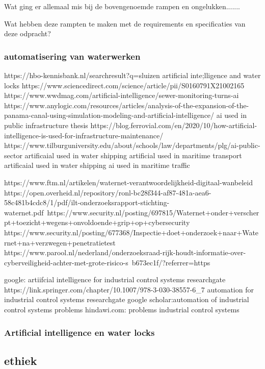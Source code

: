 Wat ging er allemaal mis bij de bovengenoemde rampen en ongelukken....... 

Wat hebben deze rampten te maken met de requirements en specificaties van deze odpracht? 


\subsubsection{automatisering van waterwerken}
https://hbo-kennisbank.nl/searchresult?q=sluizen 
artificial inte;lligence and water locks 
https://www.sciencedirect.com/science/article/pii/S0160791X21002165 
https://www.wwdmag.com/artificial-intelligence/sewer-monitoring-turns-ai 
https://www.anylogic.com/resources/articles/analysis-of-the-expansion-of-the-panama-canal-using-simulation-modeling-and-artificial-intelligence/ 
ai used in public infrastructure thesis 
https://blog.ferrovial.com/en/2020/10/how-artificial-intelligence-is-used-for-infrastructure-maintenance/ 
https://www.tilburguniversity.edu/about/schools/law/departments/plg/ai-public-sector 
artificaial used in water shipping 
artificial used in maritime transport 
artificaial used in water shipping 
ai used in maritime traffic 



https://www.ftm.nl/artikelen/waternet-verantwoordelijkheid-digitaal-wanbeleid 
https://open.overheid.nl/repository/ronl-bc28f344-af87-481a-aea6-58c481b4cdc8/1/pdf/ilt-onderzoeksrapport-stichting-waternet.pdf\ 
https://www.security.nl/posting/697815/Waternet+onder+verscherpt+toezicht+wegens+onvoldoende+grip+op+cybersecurity 
https://www.security.nl/posting/677368/Inspectie+doet+onderzoek+naar+Waternet+na+verzwegen+penetratietest 
https://www.parool.nl/nederland/onderzoeksraad-rijk-houdt-informatie-over-cyberveiligheid-achter-met-grote-risico-s~b673ec1f/?referrer=https%


google: artiifcial intelligence for industrial control systems researchgate 
https://link.springer.com/chapter/10.1007/978-3-030-38557-6_7 
automation  for industrial control systems 
researchgate 
google scholar:automation of industrial control systems problems 
hindawi.com: problems industrial control systems 

\subsubsection{Artificial intelligence en water locks}
 

\subsection{ethiek}

